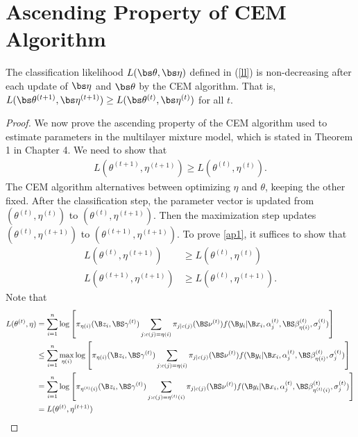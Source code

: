 \chapter{Ascending Property of CEM Algorithm}
\begin{theorem} The classification likelihood $L(\bs\theta,\bs\eta)$ defined in (\ref{ll}) is non-decreasing after each update of $\bs\eta$ and $\bs\theta$ by the CEM algorithm. That is, $L(\bs\theta^{(t+1)},\bs\eta^{(t+1)}) \geq L(\bs\theta^{(t)},\bs\eta^{(t)})$ for all $t$.
\end{theorem}
\begin{proof}
We now prove the ascending property of the CEM algorithm used to estimate parameters in the multilayer mixture model, which is stated in Theorem 1 in Chapter 4. We need to show that
    \begin{align}\label{ap1}L(\theta^{(t+1)},\eta^{(t+1)})\geq L(\theta^{(t)},\eta^{(t)}).\end{align}
    The CEM algorithm alternatives between optimizing $\eta$ and $\theta$, keeping the other fixed. After the classification step, the parameter vector is updated from $(\theta^{(t)},\eta^{(t)})$ to $(\theta^{(t)},\eta^{(t+1)})$. Then the maximization step updates $(\theta^{(t)},\eta^{(t+1)})$ to $(\theta^{(t+1)},\eta^{(t+1)})$. To prove \ref{ap1}, it suffices to show that
    \begin{align*}
    L(\theta^{(t)},\eta^{(t+1)})&\geq L(\theta^{(t)},\eta^{(t)})\\
    L(\theta^{(t+1)},\eta^{(t+1)})&\geq L(\theta^{(t)},\eta^{(t+1)}).
    \end{align*}
    Note that 
    \begin{align*}
 L(\theta^{(t)},\eta)&=\sum^{n}_{i=1}\log\left[\pi_{\eta(i)}(\B z_{i},\BS \gamma^{(t)})\sum_{j:c(j)=\eta(i)}\pi_{j|c(j)}(\BS\nu^{(t)})f(\B y_{i}|\B x_{i},\alpha_{j}^{(t)},\BS\beta^{(t)}_{\eta(i)},\sigma^{(t)}_{j})\right]\\
 &\leq \sum^{n}_{i=1}\max_{\eta(i)}\log\left[\pi_{\eta(i)}(\B z_{i},\BS \gamma^{(t)})\sum_{j:c(j)=\eta(i)}\pi_{j|c(j)}(\BS\nu^{(t)})f(\B y_{i}|\B x_{i},\alpha_{j}^{(t)},\BS\beta^{(t)}_{\eta(i)},\sigma^{(t)}_{j})\right]\\
  &= \sum^{n}_{i=1}\log\left[\pi_{\eta^{(t)}(i)}(\B z_{i},\BS \gamma^{(t)})\sum_{j:c(j)=\eta^{(t)}(i)}\pi_{j|c(j)}(\BS\nu^{(t)})f(\B y_{i}|\B x_{i},\alpha_{j}^{(t)},\BS\beta^{(t)}_{\eta^{(t)}(i)},\sigma^{(t)}_{j})\right]\\
  &= L(\theta^{(t)},\eta^{(t+1)})
    \end{align*}

\end{proof}
